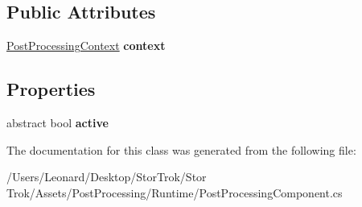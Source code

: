 \subsection*{Public Attributes}
\begin{DoxyCompactItemize}
\item 
\mbox{\label{class_unity_engine_1_1_post_processing_1_1_post_processing_component_base_a2253833defff1ca009222538992a92fd}} 
\hyperlink{class_unity_engine_1_1_post_processing_1_1_post_processing_context}{Post\+Processing\+Context} {\bfseries context}
\end{DoxyCompactItemize}
\subsection*{Properties}
\begin{DoxyCompactItemize}
\item 
\mbox{\label{class_unity_engine_1_1_post_processing_1_1_post_processing_component_base_a2ede55be3b7f31c1628341f5d0fe7b77}} 
abstract bool {\bfseries active}
\end{DoxyCompactItemize}


The documentation for this class was generated from the following file\+:\begin{DoxyCompactItemize}
\item 
/\+Users/\+Leonard/\+Desktop/\+Stor\+Trok/\+Stor Trok/\+Assets/\+Post\+Processing/\+Runtime/Post\+Processing\+Component.\+cs\end{DoxyCompactItemize}
